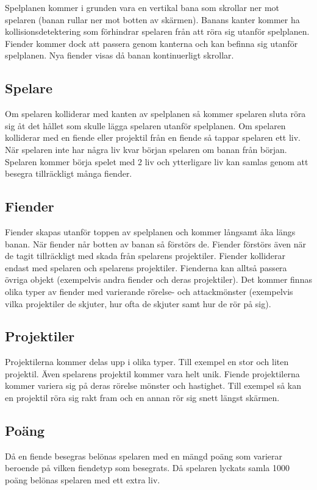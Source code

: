 \documentclass{TDP005mall}
\begin{document}
Spelplanen kommer i grunden vara en vertikal bana som skrollar ner mot spelaren (banan rullar ner mot botten av skärmen).
Banans kanter kommer ha kollisionsdetektering som förhindrar spelaren från att röra sig utanför spelplanen.
Fiender kommer dock att passera genom kanterna och kan befinna sig utanför spelplanen. Nya fiender visas då banan kontinuerligt skrollar.

\subsection{Spelare}
Om spelaren kolliderar med kanten av spelplanen så kommer spelaren sluta röra sig åt det hållet som skulle lägga spelaren utanför spelplanen. 
Om spelaren kolliderar med en fiende eller projektil från en fiende så tappar spelaren ett liv.
När spelaren inte har några liv kvar början spelaren om banan från början.
Spelaren kommer börja spelet med 2 liv och ytterligare liv kan samlas genom att besegra tillräckligt många fiender.

\subsection{Fiender}
Fiender skapas utanför toppen av spelplanen och kommer långsamt åka längs banan. 
När fiender når botten av banan så förstörs de. Fiender förstörs även när de tagit tillräckligt med skada från spelarens projektiler.
Fiender kolliderar endast med spelaren och spelarens projektiler. Fienderna kan alltså passera övriga objekt (exempelvis andra fiender och deras projektiler).
Det kommer finnas olika typer av fiender med varierande rörelse- och attackmönster (exempelvis vilka projektiler de skjuter, hur ofta de skjuter samt hur de rör på sig).

\subsection{Projektiler}
Projektilerna kommer delas upp i olika typer. Till exempel en stor och liten projektil. Även spelarens projektil kommer vara helt unik.
Fiende projektilerna kommer variera sig på deras rörelse mönster och hastighet. 
Till exempel så kan en projektil röra sig rakt fram och en annan rör sig snett längst skärmen.

\subsection{Poäng}
Då en fiende besegras belönas spelaren med en mängd poäng som varierar beroende på vilken fiendetyp som besegrats.
Då spelaren lyckats samla 1000 poäng belönas spelaren med ett extra liv.
\clearpage
\end{document}
